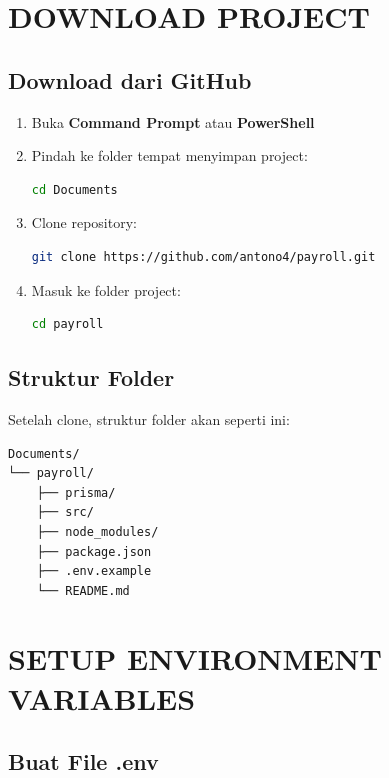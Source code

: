 \documentclass[12pt,a4paper]{article}
\begin{document}
\newpage
\section{DOWNLOAD PROJECT}

\subsection{Download dari GitHub}

\begin{enumerate}
    \item Buka \textbf{Command Prompt} atau \textbf{PowerShell}
    \item Pindah ke folder tempat menyimpan project:
\begin{lstlisting}[language=bash]
cd Documents
\end{lstlisting}
    \item Clone repository:
\begin{lstlisting}[language=bash]
git clone https://github.com/antono4/payroll.git
\end{lstlisting}
    \item Masuk ke folder project:
\begin{lstlisting}[language=bash]
cd payroll
\end{lstlisting}
\end{enumerate}

\subsection{Struktur Folder}
Setelah clone, struktur folder akan seperti ini:

\begin{verbatim}
Documents/
└── payroll/
    ├── prisma/
    ├── src/
    ├── node_modules/
    ├── package.json
    ├── .env.example
    └── README.md
\end{verbatim}

\newpage
\section{SETUP ENVIRONMENT VARIABLES}

\subsection{Buat File .env}
\end{document}
